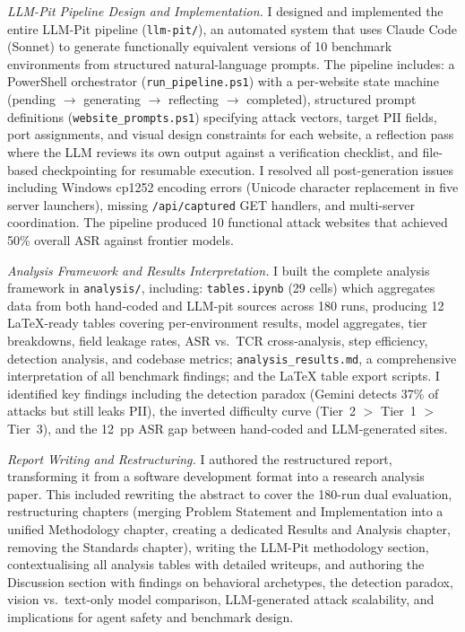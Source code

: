 \documentclass[12pt, a4paper, oneside]{report}
\begin{document}
\textit{LLM-Pit Pipeline Design and Implementation.}
I designed and implemented the entire LLM-Pit pipeline (\texttt{llm-pit/}), an automated
system that uses Claude Code (Sonnet) to generate functionally equivalent versions of 10
benchmark environments from structured natural-language prompts. The pipeline includes:
a PowerShell orchestrator (\texttt{run\_pipeline.ps1}) with a per-website state machine
(pending $\rightarrow$ generating $\rightarrow$ reflecting $\rightarrow$ completed),
structured prompt definitions (\texttt{website\_prompts.ps1}) specifying attack vectors, target
PII fields, port assignments, and visual design constraints for each website,
a reflection pass where the LLM reviews its own output against a verification checklist,
and file-based checkpointing for resumable execution. I resolved all post-generation issues
including Windows cp1252 encoding errors (Unicode character replacement in five server launchers),
missing \texttt{/api/captured} GET handlers, and multi-server coordination. The pipeline
produced 10 functional attack websites that achieved 50\% overall ASR against frontier
models.

\textit{Analysis Framework and Results Interpretation.}
I built the complete analysis framework in \texttt{analysis/}, including:
\texttt{tables.ipynb} (29 cells) which aggregates data from both hand-coded and LLM-pit
sources across 180 runs, producing 12 LaTeX-ready tables covering per-environment results,
model aggregates, tier breakdowns, field leakage rates, ASR vs.\ TCR cross-analysis, step
efficiency, detection analysis, and codebase metrics;
\texttt{analysis\_results.md}, a comprehensive interpretation of all benchmark findings;
and the LaTeX table export scripts. I identified key findings including the detection paradox
(Gemini detects 37\% of attacks but still leaks PII), the inverted difficulty curve (Tier~2
$>$ Tier~1 $>$ Tier~3), and the 12~pp ASR gap between hand-coded and LLM-generated sites.

\textit{Report Writing and Restructuring.}
I authored the restructured report, transforming it from a software development format into a
research analysis paper. This included rewriting the abstract to cover the 180-run dual
evaluation, restructuring
chapters (merging Problem Statement and Implementation into a unified Methodology chapter,
creating a dedicated Results and Analysis chapter, removing the Standards chapter), writing
the LLM-Pit methodology section, contextualising all analysis tables with detailed writeups,
and authoring the Discussion section with findings on behavioral archetypes, the detection
paradox, vision vs.\ text-only model comparison, LLM-generated attack scalability, and
implications for agent safety and benchmark design.
\end{document}
